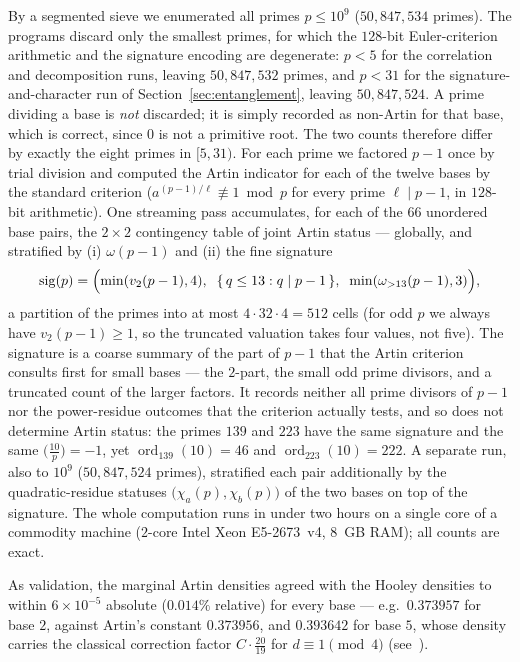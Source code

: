 \documentclass[11pt,reqno]{amsart}
\theoremstyle{plain}
\theoremstyle{definition}
\begin{document}
By a segmented sieve we enumerated all primes $p \le 10^9$
($50{,}847{,}534$ primes). The programs discard only the smallest primes, for
which the $128$-bit Euler-criterion arithmetic and the signature encoding are
degenerate: $p < 5$ for the correlation and decomposition runs, leaving
$50{,}847{,}532$ primes, and $p < 31$ for the signature-and-character run of
Section~\ref{sec:entanglement}, leaving $50{,}847{,}524$. A prime dividing a
base is \emph{not} discarded; it is simply recorded as non-Artin for that base,
which is correct, since $0$ is not a primitive root. The two counts therefore
differ by exactly the eight primes in $[5, 31)$. For each prime we
factored $p - 1$ once by trial division and computed the Artin indicator for
each of the twelve bases by the standard criterion
($a^{(p-1)/\ell} \not\equiv 1 \bmod p$ for every prime $\ell \mid p-1$, in
$128$-bit arithmetic). One streaming pass accumulates, for each of the $66$
unordered base pairs, the $2 \times 2$ contingency table of joint Artin
status --- globally, and stratified by (i) $\omega(p-1)$ and (ii) the fine
signature
\[
  \mathrm{sig}(p) = \Bigl(\min(v_2(p-1), 4),\;\;
  \{\, q \le 13 : q \mid p-1 \,\},\;\; \min(\omega_{>13}(p-1), 3)\Bigr),
\]
a partition of the primes into at most $4 \cdot 32 \cdot 4 = 512$ cells (for
odd $p$ we always have $v_2(p-1) \ge 1$, so the truncated valuation takes four
values, not five). The
signature is a coarse summary of the part of $p-1$ that the Artin criterion
consults first for small bases --- the $2$-part, the small odd prime divisors,
and a truncated count of the larger factors. It records neither all prime
divisors of $p-1$ nor the power-residue outcomes that the criterion actually
tests, and so does not determine Artin status: the primes $139$ and $223$ have
the same signature and the same $\bigl(\tfrac{10}{p}\bigr) = -1$, yet
$\operatorname{ord}_{139}(10) = 46$ and $\operatorname{ord}_{223}(10) = 222$. A separate run, also to $10^9$ ($50{,}847{,}524$ primes), stratified
each pair additionally by the quadratic-residue statuses
$\bigl(\chi_a(p), \chi_b(p)\bigr)$ of the two bases on top of the signature.
The whole computation runs in under two hours on a single core of a
commodity machine ($2$-core Intel Xeon E5-2673~v4, $8$~GB RAM); all counts
are exact.

As validation, the marginal Artin densities agreed with the Hooley densities
to within $6 \times 10^{-5}$ absolute ($0.014\%$ relative) for every base ---
e.g.\ $0.373957$ for base $2$, against Artin's constant
$0.373956$, and $0.393642$ for base $5$, whose density carries the classical
correction factor $C \cdot \tfrac{20}{19}$ for
$d \equiv 1 \pmod 4$ (see~\cite{Hooley1967, Moree2012}).
\end{document}
